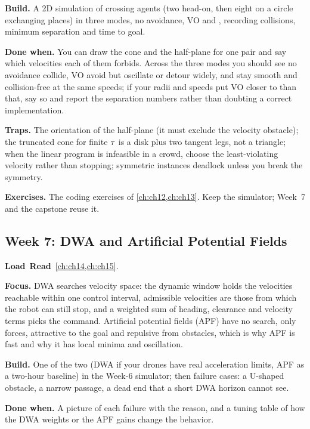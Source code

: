 \textbf{Build.} A 2D simulation of crossing agents (two head-on, then eight on a circle
exchanging places) in three modes, no avoidance, VO and \orca, recording collisions,
minimum separation and time to goal.

\textbf{Done when.} You can draw the cone and the \orca half-plane for one pair and say
which velocities each of them forbids. Across the three modes you should see no avoidance
collide, VO avoid but oscillate or detour widely, and \orca stay smooth and collision-free
at the same speeds; if your radii and speeds put VO closer to \orca than that, say so and
report the separation numbers rather than doubting a correct implementation.

\textbf{Traps.} The orientation of the half-plane (it must exclude the velocity obstacle);
the truncated cone for finite $\tau$ is a disk plus two tangent legs, not a triangle; when
the linear program is infeasible in a crowd, choose the least-violating velocity rather than
stopping; symmetric instances deadlock unless you break the symmetry.

\textbf{Exercises.} The coding exercises of \cref{ch:ch12,ch:ch13}. Keep the simulator;
Week~7 and the capstone reuse it.

\subsection{Week 7: DWA and Artificial Potential Fields}
\label{sec:appA-week07}
\noindent\textbf{Load}\ \quad\textbf{Read}\ \cref{ch:ch14,ch:ch15}.

\textbf{Focus.} DWA searches velocity space: the dynamic window holds the velocities
reachable within one control interval, admissible velocities are those from which the robot
can still stop, and a weighted sum of heading, clearance and velocity terms picks the
command. Artificial potential fields (APF) have no search, only forces, attractive to the
goal and repulsive from obstacles, which is why APF is fast and why it has local minima and
oscillation.

\textbf{Build.} One of the two (DWA if your drones have real acceleration limits, APF as a
two-hour baseline) in the Week-6 simulator; then failure cases: a U-shaped obstacle, a
narrow passage, a dead end that a short DWA horizon cannot see.

\textbf{Done when.} A picture of each failure with the reason, and a tuning table of how the
DWA weights or the APF gains change the behavior.

